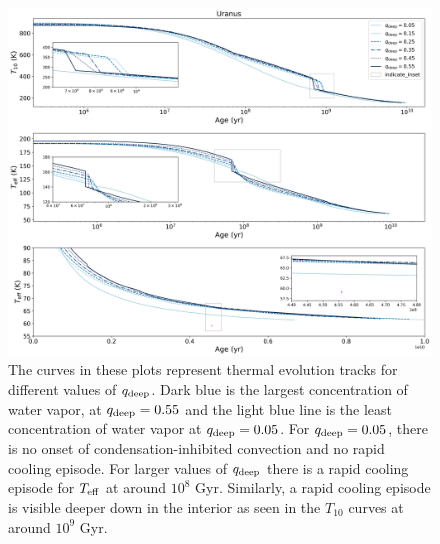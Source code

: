 \documentclass[11pt]{ucscthesisbs}
\begin{document}
\begin{figure}[ht]
 \centerline{
  \includegraphics[scale=0.45]{figures/u_cooling_curves_nz_4096_more_qdeeps.png}
 }
\caption[Thermal Evolution Curves for Uranus - Water Vapor Concentration Comparisons]
{The curves in these plots represent thermal evolution tracks for different values of $q_{\rm deep}$. Dark blue is the largest concentration of water vapor, at $q_{\rm deep} = 0.55$ and the light blue line is the least concentration of water vapor at $q_{\rm deep} = 0.05$. For $q_{\rm deep} = 0.05$, there is no onset of condensation-inhibited convection and no rapid cooling episode. For larger values of $q_{\rm deep}$ there is a rapid cooling episode for $T_{\rm eff}$ at around $10^8$ Gyr. Similarly, a rapid cooling episode is visible deeper down in the interior as seen in the $T_{10}$ curves at around $10^9$ Gyr. }
\label{fig:evolve_uranus_qdeeps}
\end{figure}

 
\end{document}

